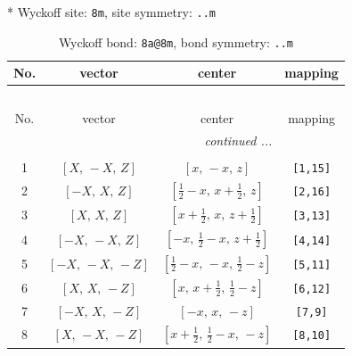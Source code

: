 \documentclass[fleqn,8pt]{jsarticle}
\begin{document}
* Wyckoff site: {\tt 8m}, site symmetry: {\tt ..m}
\renewcommand{\arraystretch}{1.2}
\begin{longtable}{cccc}
\caption{Wyckoff bond: {\tt 8a@8m}, bond symmetry: {\tt ..m}}
 \\
 \hline \hline
No. & vector & center & mapping \\ \hline \endfirsthead

\multicolumn{3}{l}{\tablename\ \thetable{}} \\
 \hline \hline
No. & vector & center & mapping \\ \hline \endhead

 \hline \hline
\multicolumn{3}{r}{\footnotesize\it continued ...} \\ \endfoot

 \hline \hline
\multicolumn{3}{r}{} \\ \endlastfoot

1 & $\left[ X,\, - X,\, Z \right]$ & $\left[ x,\, - x,\, z \right]$ & {\tt [1,15]} \\ \hline
2 & $\left[ - X,\, X,\, Z \right]$ & $\left[ \frac{1}{2} - x,\, x + \frac{1}{2},\, z \right]$ & {\tt [2,16]} \\ \hline
3 & $\left[ X,\, X,\, Z \right]$ & $\left[ x + \frac{1}{2},\, x,\, z + \frac{1}{2} \right]$ & {\tt [3,13]} \\ \hline
4 & $\left[ - X,\, - X,\, Z \right]$ & $\left[ - x,\, \frac{1}{2} - x,\, z + \frac{1}{2} \right]$ & {\tt [4,14]} \\ \hline
5 & $\left[ - X,\, - X,\, - Z \right]$ & $\left[ \frac{1}{2} - x,\, - x,\, \frac{1}{2} - z \right]$ & {\tt [5,11]} \\ \hline
6 & $\left[ X,\, X,\, - Z \right]$ & $\left[ x,\, x + \frac{1}{2},\, \frac{1}{2} - z \right]$ & {\tt [6,12]} \\ \hline
7 & $\left[ - X,\, X,\, - Z \right]$ & $\left[ - x,\, x,\, - z \right]$ & {\tt [7,9]} \\ \hline
8 & $\left[ X,\, - X,\, - Z \right]$ & $\left[ x + \frac{1}{2},\, \frac{1}{2} - x,\, - z \right]$ & {\tt [8,10]} \\
\end{longtable}
\renewcommand{\arraystretch}{1.2}
\end{document}
